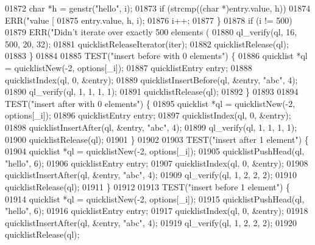 \begin{DoxyCode}
{{{{{{{{{{{{{{{{{{{{{{{{{{{{{{{{{{{{{{{{{{{{{{{01872                 \textcolor{keywordtype}{char} *h = genstr(\textcolor{stringliteral}{"hello"}, i);
01873                 \textcolor{keywordflow}{if} (strcmp((\textcolor{keywordtype}{char} *)entry.value, h))
01874                     ERR(\textcolor{stringliteral}{"value [%
01875                         entry.value, h, i);
01876                 i++;
01877             \}
01878             \textcolor{keywordflow}{if} (i != 500)
01879                 ERR(\textcolor{stringliteral}{"Didn't iterate over exactly 500 elements (%
01880             ql\_verify(ql, 16, 500, 20, 32);
01881             quicklistReleaseIterator(iter);
01882             quicklistRelease(ql);
01883         \}
01884 
01885         TEST(\textcolor{stringliteral}{"insert before with 0 elements"}) \{
01886             quicklist *ql = quicklistNew(-2, options[\_i]);
01887             quicklistEntry entry;
01888             quicklistIndex(ql, 0, &entry);
01889             quicklistInsertBefore(ql, &entry, \textcolor{stringliteral}{"abc"}, 4);
01890             ql\_verify(ql, 1, 1, 1, 1);
01891             quicklistRelease(ql);
01892         \}
01893 
01894         TEST(\textcolor{stringliteral}{"insert after with 0 elements"}) \{
01895             quicklist *ql = quicklistNew(-2, options[\_i]);
01896             quicklistEntry entry;
01897             quicklistIndex(ql, 0, &entry);
01898             quicklistInsertAfter(ql, &entry, \textcolor{stringliteral}{"abc"}, 4);
01899             ql\_verify(ql, 1, 1, 1, 1);
01900             quicklistRelease(ql);
01901         \}
01902 
01903         TEST(\textcolor{stringliteral}{"insert after 1 element"}) \{
01904             quicklist *ql = quicklistNew(-2, options[\_i]);
01905             quicklistPushHead(ql, \textcolor{stringliteral}{"hello"}, 6);
01906             quicklistEntry entry;
01907             quicklistIndex(ql, 0, &entry);
01908             quicklistInsertAfter(ql, &entry, \textcolor{stringliteral}{"abc"}, 4);
01909             ql\_verify(ql, 1, 2, 2, 2);
01910             quicklistRelease(ql);
01911         \}
01912 
01913         TEST(\textcolor{stringliteral}{"insert before 1 element"}) \{
01914             quicklist *ql = quicklistNew(-2, options[\_i]);
01915             quicklistPushHead(ql, \textcolor{stringliteral}{"hello"}, 6);
01916             quicklistEntry entry;
01917             quicklistIndex(ql, 0, &entry);
01918             quicklistInsertAfter(ql, &entry, \textcolor{stringliteral}{"abc"}, 4);
01919             ql\_verify(ql, 1, 2, 2, 2);
01920             quicklistRelease(ql);
}}}}}}}}}}}}}}}}}}}}}}}}}}}}}}}}}}}}}}}}}}}}}}}}}
\end{DoxyCode}
